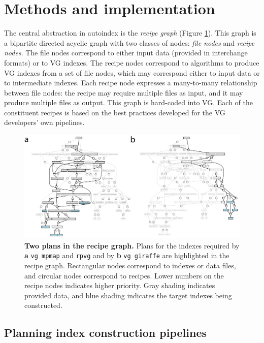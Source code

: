 \documentclass[11pt]{ucthesis}
\begin{document}
\section{Methods and implementation}

The central abstraction in autoindex is the \emph{recipe graph} (Figure \ref{fig:recipe_graph}). This graph is a bipartite directed acyclic graph with two classes of nodes: \emph{file nodes} and \emph{recipe nodes}. The file nodes correspond to either input data (provided in interchange formats) or to VG indexes. The recipe nodes correspond to algorithms to produce VG indexes from a set of file nodes, which may correspond either to input data or to intermediate indexes. Each recipe node expresses a many-to-many relationship between file nodes: the recipe may require multiple files as input, and it may produce multiple files as output. This graph is hard-coded into VG. Each of the constituent recipes is based on the best practices developed for the VG developers' own pipelines.

\begin{figure}[h]
  \centering
  \includegraphics[width=\textwidth]{autoindexfigures/recipe_graph.pdf}
  \caption{
    \label{fig:recipe_graph}
    \textbf{Two plans in the recipe graph.}
    Plans for the indexes required by \textbf{a} \texttt{vg mpmap} and \texttt{rpvg} and by \textbf{b} \texttt{vg giraffe} are highlighted in the recipe graph. Rectangular nodes correspond to indexes or data files, and circular nodes correspond to recipes. Lower numbers on the recipe nodes indicates higher priority. Gray shading indicates provided data, and blue shading indicates the target indexes being constructed.
    }
\end{figure}

\subsection{Planning index construction pipelines}
\end{document}
